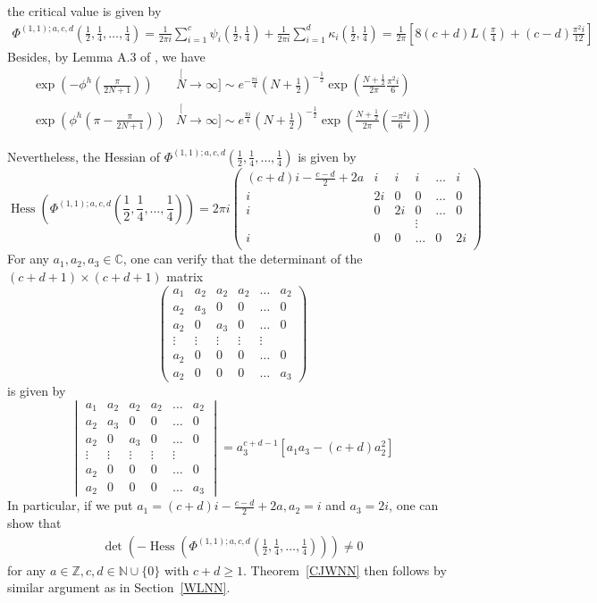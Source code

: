 \documentclass[10pt,a4paper]{article}
\newcommand{\lt}{\left}
\newcommand{\rt}{\right}
\def \CC{\mathbb C}
\def\CC{{\mathbb C}}
\def\ZZ{{\mathbb Z}}
\def\NN{{\mathbb N}}
\def \det{\operatorname{det}}
\def \Hess{\operatorname{Hess}}
\begin{document}
the critical value is given by
\begin{align*}
\Phi^{(1,1);a,c,d} \lt(\frac{1}{2},\frac{1}{4},\dots, \frac{1}{4}\rt)
= \frac{1}{2\pi i} \sum_{i=1}^c \psi_i \lt(\frac{1}{2},\frac{1}{4}\rt) + \frac{1}{2\pi i} \sum_{i=1}^d \kappa_i \lt(\frac{1}{2},\frac{1}{4} \rt)
= \frac{1}{2\pi} \lt[8(c+d)L\lt(\frac{\pi}{4}\rt) + (c-d)\frac{\pi^2 i}{12} \rt]
\end{align*}
Besides, by Lemma A.3 of \cite{O52}, we have
\begin{align}\label{QDFcoe}
\exp\lt(-\phi^h \lt( \frac{\pi}{2N+1} \rt) \rt) 
&\stackrel[N \to \infty]{\sim}{ } e^{-\frac{\pi i}{4}}(N+\frac{1}{2})^{-\frac{1}{2}}\exp\lt( \frac{N+\frac{1}{2}}{2\pi} \frac{\pi^2 i}{6} \rt) \\
\exp\lt(\phi^h \lt(\pi - \frac{\pi}{2N+1} \rt) \rt) 
&\stackrel[N \to \infty]{\sim}{ } e^{\frac{\pi i}{4}}(N+\frac{1}{2})^{-\frac{1}{2}}\exp\lt( \frac{N+\frac{1}{2}}{2\pi} \lt(\frac{-\pi^2 i}{6}\rt) \rt)
\end{align}

Nevertheless, the Hessian of $\Phi^{(1,1);a,c,d}(\frac{1}{2},\frac{1}{4},\dots, \frac{1}{4})$ is given by
$$   
\Hess\lt(\Phi^{(1,1);a,c,d}\lt(\frac{1}{2},\frac{1}{4},\dots, \frac{1}{4}\rt)\rt) = 2\pi i
\begin{pmatrix}
    (c+d)i - \frac{c-d}{2} +2a & i  & i & i &\dots  & i\\
    i & 2i  & 0 & 0 &\dots  &0\\
    i & 0& 2i &0 &\dots  &0\\
    &&&\vdots\\
    i & 0 & 0 &\dots &0 & 2i\\
\end{pmatrix}
$$
For any $a_1,a_2,a_3 \in \CC$, one can verify that the determinant of the $(c+d+1)\times (c+d+1)$ matrix
$$
\begin{pmatrix}
a_1&a_2&a_2&a_2&\dots&a_2 \\
a_2&a_3&0&0&\dots&0 \\
a_2&0&a_3&0&\dots&0 \\
\vdots&\vdots&\vdots&\vdots&\vdots\\
a_2&0&0&0&\dots&0 \\
a_2&0&0&0&\dots&a_3
\end{pmatrix}
$$
is given by
$$
\begin{vmatrix}
a_1&a_2&a_2&a_2&\dots&a_2 \\
a_2&a_3&0&0&\dots&0 \\
a_2&0&a_3&0&\dots&0 \\
\vdots&\vdots&\vdots&\vdots&\vdots\\
a_2&0&0&0&\dots&0 \\
a_2&0&0&0&\dots&a_3
\end{vmatrix}
=
a_3^{c+d-1}[a_1a_3-(c+d)a_2^2]
$$
In particular, if we put $a_1=(c+d)i - \frac{c-d}{2}+2a, a_2=i$ and $a_3=2i$, one can show that
\begin{align*}
\det\lt(-\Hess\lt(\Phi^{(1,1);a,c,d}\lt(\frac{1}{2},\frac{1}{4},\dots, \frac{1}{4}\rt)\rt) \rt)
\neq 0
\end{align*}
for any $a\in \ZZ, c,d\in \NN\cup\{0\}$ with $c+d\geq 1$. Theorem~\ref{CJWNN} then follows by similar argument as in Section~\ref{WLNN}.
\end{document}

